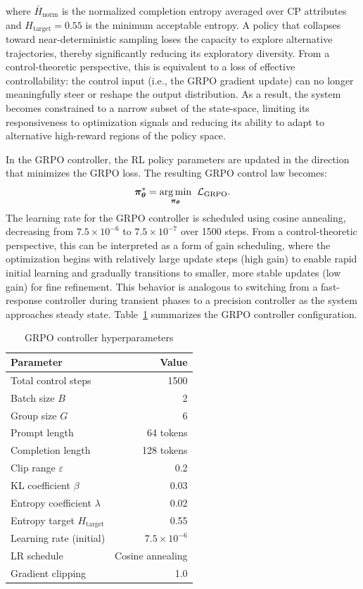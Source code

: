 \documentclass[letterpaper, 10 pt, conference]{ieeeconf}
\begin{document}
where $\bar{H}_{\mathrm{norm}}$ is the normalized completion entropy averaged over CP attributes and $H_{\mathrm{target}} = 0.55$ is the minimum acceptable entropy. 
A policy that collapses toward near-deterministic sampling loses the capacity to explore alternative trajectories, thereby significantly reducing its exploratory diversity. From a control-theoretic perspective, this is equivalent to a loss of effective controllability: the control input (i.e., the GRPO gradient update) can no longer meaningfully steer or reshape the output distribution. As a result, the system becomes constrained to a narrow subset of the state-space, limiting its responsiveness to optimization signals and reducing its ability to adapt to alternative high-reward regions of the policy space.

\par In the GRPO controller, the RL policy parameters are updated in the direction that minimizes the GRPO loss.  The resulting GRPO control law becomes:
\begin{equation}
    \label{GRPO_control}
    \bm{\pi}_{\bm{\theta}}^{*}=\underset{\bm{\pi}_{\bm{\theta}}}{\arg \min} \hspace{.2cm}  \mathcal{L}_{\mathrm{GRPO}}.
\end{equation} 
The learning rate for the GRPO controller is scheduled using cosine annealing, decreasing from $7.5 \times 10^{-6}$ to $7.5 \times 10^{-7}$ over 1500 steps. From a control-theoretic perspective, this can be interpreted as a form of gain scheduling, where the optimization begins with relatively large update steps (high gain) to enable rapid initial learning and gradually transitions to smaller, more stable updates (low gain) for fine refinement. This behavior is analogous to switching from a fast-response controller during transient phases to a precision controller as the system approaches steady state. Table~\ref{tab:grpo} summarizes the GRPO controller configuration.

\begin{table}[t]
\centering
\caption{GRPO controller hyperparameters}
\label{tab:grpo}
\begin{tabular}{@{}lr@{}}
\toprule
\textbf{Parameter} & \textbf{Value} \\
\midrule
Total control steps & 1500 \\
Batch size $B$ & 2 \\
Group size $G$ & 6 \\
Prompt length & 64 tokens \\
Completion length & 128 tokens \\
Clip range $\varepsilon$ & 0.2 \\
KL coefficient $\beta$ & 0.03 \\
Entropy coefficient $\lambda$ & 0.02 \\
Entropy target $H_{\mathrm{target}}$ & 0.55 \\
Learning rate (initial) & $7.5 \times 10^{-6}$ \\
LR schedule & Cosine annealing \\
Gradient clipping & 1.0 \\
\bottomrule
\end{tabular}
\end{table}
\end{document}
